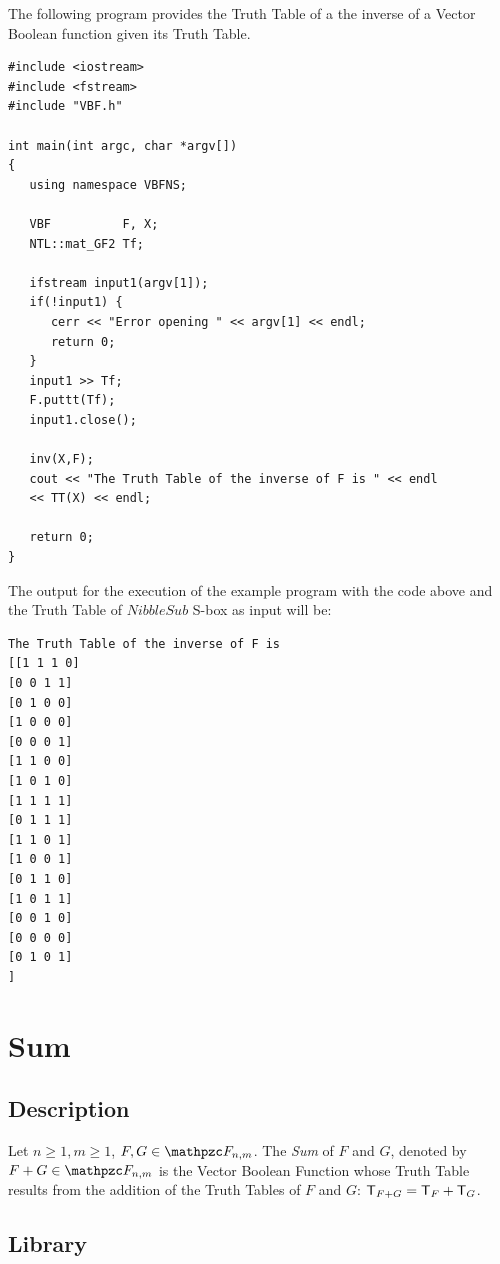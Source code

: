 \begin{example}
The following program provides the Truth Table of a the inverse of a Vector Boolean function given its Truth Table.

\begin{verbatim}
#include <iostream>
#include <fstream>
#include "VBF.h"

int main(int argc, char *argv[])
{
   using namespace VBFNS;

   VBF          F, X;
   NTL::mat_GF2 Tf;

   ifstream input1(argv[1]);
   if(!input1) {
      cerr << "Error opening " << argv[1] << endl;
      return 0;
   }
   input1 >> Tf;
   F.puttt(Tf);
   input1.close();

   inv(X,F);
   cout << "The Truth Table of the inverse of F is " << endl
   << TT(X) << endl;

   return 0;
}
\end{verbatim}

The output for the execution of the example program with the code above and the Truth Table of $NibbleSub$ S-box as input will be:

\begin{verbatim}
The Truth Table of the inverse of F is
[[1 1 1 0]
[0 0 1 1]
[0 1 0 0]
[1 0 0 0]
[0 0 0 1]
[1 1 0 0]
[1 0 1 0]
[1 1 1 1]
[0 1 1 1]
[1 1 0 1]
[1 0 0 1]
[0 1 1 0]
[1 0 1 1]
[0 0 1 0]
[0 0 0 0]
[0 1 0 1]
]
\end{verbatim}
\end{example}

\section{Sum}\label{sec:Sum}

\subsection{Description}

\begin{definition}
Let $n \geq 1, m \geq 1$, $F,G \in \funct{F}_{n,m}$. The \textit{Sum} of $F$ and $G$, denoted by $F + G \in \funct{F}_{n,m}$ 
is the Vector Boolean Function whose Truth Table results from the addition of the Truth Tables of $F$ and $G$: $\matr{T}_{F+G} = \matr{T}_F+\matr{T}_G$. 
\end{definition}

\subsection{Library}

